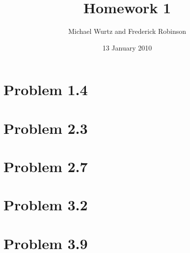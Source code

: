 \documentclass{article}
\title{Homework 1}
\author{Michael Wurtz and Frederick Robinson}
\date{13 January 2010}
\begin{document}

   \maketitle

\section{Problem 1.4}
\section{Problem 2.3}
\section{Problem 2.7}
\section{Problem 3.2}
\section{Problem 3.9}
\end{document}
